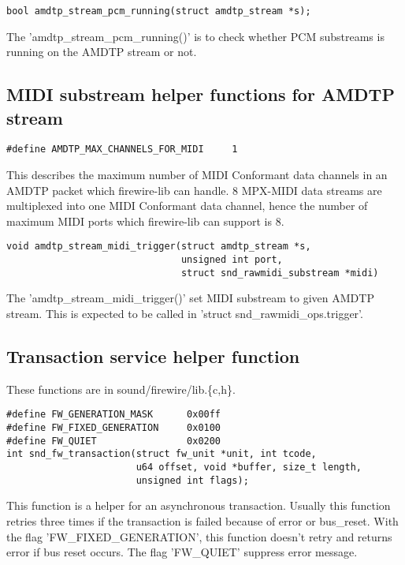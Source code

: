 \documentclass[onecolumn]{article}
\begin{document}
\begin{verbatim}
bool amdtp_stream_pcm_running(struct amdtp_stream *s);
\end{verbatim}

The 'amdtp\_stream\_pcm\_running()' is to check whether PCM substreams is running on the AMDTP stream or not.


\subsection{MIDI substream helper functions for AMDTP stream}

\begin{verbatim}
#define AMDTP_MAX_CHANNELS_FOR_MIDI     1
\end{verbatim}

This describes the maximum number of MIDI Conformant data channels in an AMDTP packet which firewire-lib can handle. 8 MPX-MIDI data streams are multiplexed into one MIDI Conformant data channel\cite{amei-rp27, iec61883-6-2}, hence the number of maximum MIDI ports which firewire-lib can support is 8.

\begin{verbatim}
void amdtp_stream_midi_trigger(struct amdtp_stream *s,
                               unsigned int port,
                               struct snd_rawmidi_substream *midi)
\end{verbatim}

The 'amdtp\_stream\_midi\_trigger()' set MIDI substream to given AMDTP stream. This is expected to be called in 'struct snd\_rawmidi\_ops.trigger'.


\subsection{Transaction service helper function}

These functions are in sound/firewire/lib.\{c,h\}.

\begin{verbatim}
#define FW_GENERATION_MASK      0x00ff
#define FW_FIXED_GENERATION     0x0100
#define FW_QUIET                0x0200
int snd_fw_transaction(struct fw_unit *unit, int tcode,
                       u64 offset, void *buffer, size_t length,
                       unsigned int flags);
\end{verbatim}

This function is a helper for an asynchronous transaction. Usually this function retries three times if the transaction is failed because of error or bus\_reset. With the flag 'FW\_FIXED\_GENERATION', this function doesn't retry and returns error if bus reset occurs. The flag 'FW\_QUIET' suppress error message.
\end{document}
